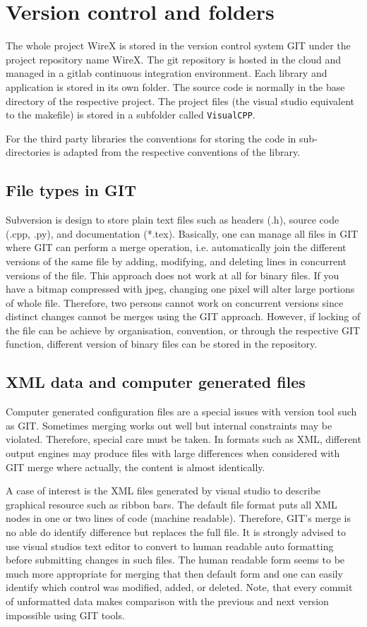 \documentclass[11pt,a4paper,onepage,openany]{book}
\begin{document}
\section{Version control and folders}
The whole project WireX is stored in the version control system GIT under the
project repository name
WireX. The git repository is hosted in the cloud and managed in a gitlab
continuous integration environment. Each library and application is stored in
its own folder. The source
code is normally in the base directory of the respective project. The project
files (the visual studio equivalent to the makefile) is stored in a subfolder
called \texttt{VisualCPP}.

For the third party libraries the conventions for storing the code in
sub-directories is adapted from the respective conventions of the library.

\subsection{File types in GIT}
Subversion is design to store plain text files such as headers (.h), source
code (.cpp, .py), and documentation (*.tex). Basically, one can manage all
files in GIT where GIT can perform a merge operation, i.e. automatically join
the different versions of the same file by adding, modifying, and deleting
lines in concurrent versions of the file. This approach does not work at all
for binary files. If you have a bitmap compressed with jpeg, changing one pixel
will alter large portions of whole file. Therefore, two persons cannot work on
concurrent versions since distinct changes cannot be merges using the GIT
approach. However, if locking of the file can be achieve by organisation,
convention, or through the respective GIT function, different version of binary
files can be stored in the repository.

\subsection{XML data and computer generated files}
Computer generated configuration files are a special issues with version tool
such as GIT. Sometimes merging works out well but internal constraints may be
violated. Therefore, special care must be taken. In formats such as XML,
different output engines may produce files with large differences when
considered with GIT merge where actually, the content is almost identically.

A case of interest is the XML files generated by visual studio to describe
graphical resource such as ribbon bars. The default file format puts all XML
nodes in one or two lines of code (machine readable). Therefore, GIT's merge is
no able do identify difference but replaces the full file. It is strongly
advised to use visual studios text editor to convert to human readable auto
formatting before submitting changes in such files. The human readable form
seems to be much more appropriate for merging that then default form and one
can easily identify which control was modified, added, or deleted. Note, that
every commit of unformatted data makes comparison with the previous and next
version impossible using GIT tools.
\end{document}
